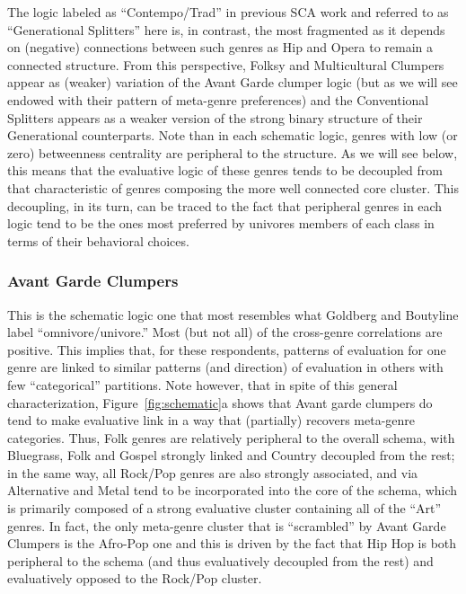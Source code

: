 \documentclass[preprint,12pt]{elsarticle}
\begin{document}
The logic labeled as ``Contempo/Trad'' in previous SCA work and referred to as ``Generational Splitters'' here is, in contrast, the most fragmented as it depends on (negative) connections between such genres as Hip and Opera to remain a connected structure. From this perspective, Folksy and Multicultural Clumpers appear as (weaker) variation of the Avant Garde clumper logic (but as we will see endowed with their pattern of meta-genre preferences) and the Conventional Splitters appears as a weaker version of the strong binary structure of their Generational counterparts. Note than in each schematic logic, genres with low (or zero) betweenness centrality are peripheral to the structure. As we will see below, this means that the evaluative logic of these genres tends to be decoupled from that characteristic of genres composing the more well connected core cluster. This decoupling, in its turn, can be traced to the fact that peripheral genres in each logic tend to be the ones most preferred by univores members of each class in terms of their behavioral choices.

\subsubsection{Avant Garde Clumpers}
This is the schematic logic one that most resembles what Goldberg and Boutyline label ``omnivore/univore.'' Most (but not all) of the cross-genre correlations are positive. This implies that, for these respondents, patterns of evaluation for one genre are linked to similar patterns (and direction) of evaluation in others with few ``categorical'' partitions. Note however, that in spite of this general characterization, Figure~\ref{fig:schematic}a shows that Avant garde clumpers do tend to make evaluative link in a way that (partially) recovers meta-genre categories. Thus, Folk genres are relatively peripheral to the overall schema, with Bluegrass, Folk and Gospel strongly linked and Country decoupled from the rest; in the same way, all Rock/Pop genres are also strongly associated, and via Alternative and Metal tend to be incorporated into the core of the schema, which is primarily composed of a strong evaluative cluster containing all of the ``Art'' genres. In fact, the only meta-genre cluster that is ``scrambled'' by Avant Garde Clumpers is the Afro-Pop one and this is driven by the fact that Hip Hop is both peripheral to the schema (and thus evaluatively decoupled from the rest) and evaluatively opposed to the Rock/Pop cluster. 
\end{document}
